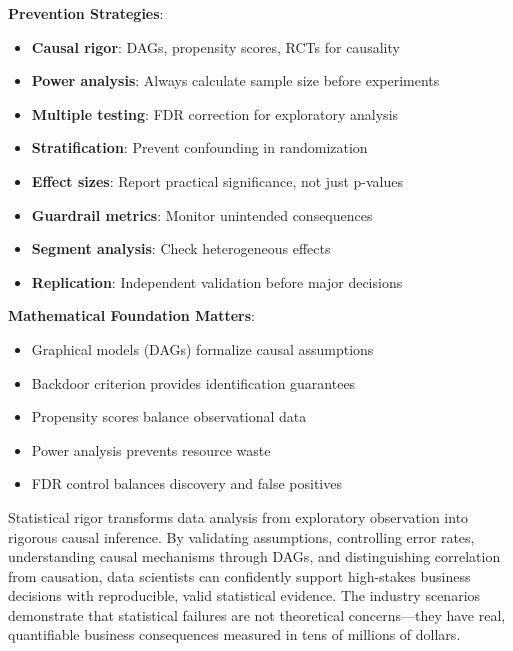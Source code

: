 \textbf{Prevention Strategies}:
\begin{itemize}
    \item \textbf{Causal rigor}: DAGs, propensity scores, RCTs for causality
    \item \textbf{Power analysis}: Always calculate sample size before experiments
    \item \textbf{Multiple testing}: FDR correction for exploratory analysis
    \item \textbf{Stratification}: Prevent confounding in randomization
    \item \textbf{Effect sizes}: Report practical significance, not just p-values
    \item \textbf{Guardrail metrics}: Monitor unintended consequences
    \item \textbf{Segment analysis}: Check heterogeneous effects
    \item \textbf{Replication}: Independent validation before major decisions
\end{itemize}

\textbf{Mathematical Foundation Matters}:
\begin{itemize}
    \item Graphical models (DAGs) formalize causal assumptions
    \item Backdoor criterion provides identification guarantees
    \item Propensity scores balance observational data
    \item Power analysis prevents resource waste
    \item FDR control balances discovery and false positives
\end{itemize}

Statistical rigor transforms data analysis from exploratory observation into rigorous causal inference. By validating assumptions, controlling error rates, understanding causal mechanisms through DAGs, and distinguishing correlation from causation, data scientists can confidently support high-stakes business decisions with reproducible, valid statistical evidence. The industry scenarios demonstrate that statistical failures are not theoretical concerns---they have real, quantifiable business consequences measured in tens of millions of dollars.
